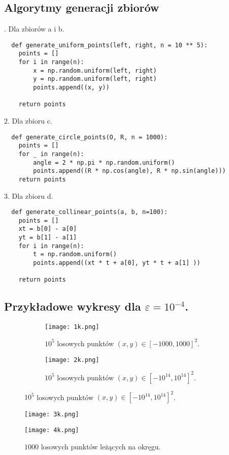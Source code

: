 \subsection{Algorytmy generacji zbiorów}
. Dla zbiorów a i b.
 \begin{lstlisting}
  def generate_uniform_points(left, right, n = 10 ** 5):
    points = []
    for i in range(n):
        x = np.random.uniform(left, right)
        y = np.random.uniform(left, right)
        points.append((x, y))

    return points
\end{lstlisting}
\par
2. Dla zbioru c.
\begin{lstlisting}
  def generate_circle_points(O, R, n = 1000):
    points = []
    for _ in range(n):
        angle = 2 * np.pi * np.random.uniform()
        points.append((R * np.cos(angle), R * np.sin(angle)))
    return points
\end{lstlisting}
\par
3. Dla zbioru d.
\begin{lstlisting}
  def generate_collinear_points(a, b, n=100):
    points = []
    xt = b[0] - a[0]
    yt = b[1] - a[1]
    for i in range(n):
        t = np.random.uniform()
        points.append((xt * t + a[0], yt * t + a[1] ))
    
    return points
\end{lstlisting}
\subsection{Przykładowe wykresy dla $\varepsilon = 10^{-4}$.}
\begin{figure}[h]
    \centering
    \begin{subfigure}{.5\textwidth}
      \centering
      \texttt{[image: 1k.png]}
      \caption{$10^5$ losowych punktów $(x, y) \in \left[-1000,1000\right]^{2}$.}
      \label{fig:sub1}
    \end{subfigure}%
    \begin{subfigure}{.5\textwidth}
      \centering
      \texttt{[image: 2k.png]}
      \caption{$10^5$ losowych punktów $(x, y) \in \left[-10^{14},10^{14}\right]^{2}$.}
      \label{fig:sub2}
    \end{subfigure}
    \label{fig:test}
    \end{figure}
    
    \begin{figure}[h]
    \centering
    \begin{minipage}{.5\textwidth}
      \centering
      \texttt{[image: 3k.png]}
      \caption{$1000$ losowych punktów leżących na okręgu.}
      \label{fig:test1}
    \end{minipage}%
    \begin{minipage}{.5\textwidth}
      \centering
      \texttt{[image: 4k.png]}
      \label{fig:test2}
    \end{minipage}
    \end{figure}
